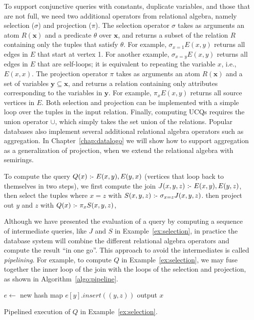 To support conjunctive queries with constants, 
 duplicate variables, and those that are not full,
 we need two additional operators from relational algebra, 
 namely selection ($\sigma$) and projection ($\pi$).
The selection operator $\sigma$ takes as arguments an atom $R({\bm x})$
 and a predicate $\theta$ over ${\bm x}$,
 and returns a subset of the relation $R$ containing only the tuples that satisfy $\theta$.
For example, $\sigma_{x = 1}E(x, y)$ returns all edges in $E$ that start at vertex 1.
For another example, $\sigma_{x = y}E(x, y)$ returns all edges in $E$ that are self-loops;
 it is equivalent to repeating the variable $x$, i.e., $E(x, x)$.
The projection operator $\pi$ takes as arguments an atom $R({\bm x})$
 and a set of variables ${\bm y} \subseteq {\bm x}$,
 and returns a relation containing only attributes corresponding 
 to the variables in ${\bm y}$.
For example, $\pi_{x}E(x, y)$ returns all source vertices in $E$.
Both selection and projection can be implemented with a simple loop over the tuples in the input relation.
Finally, computing UCQs requires the union operator $\cup$,
 which simply takes the set union of the relations.
Popular databases also implement several additional relational algebra operators 
 such as aggregation.
In Chapter~\ref{chap:datalogo} we will show how to support aggregation
 as a generalization of projection, 
 when we extend the relational algebra with semirings.

\begin{ex}
\label{ex:selection}
To compute the query $Q(x) \text{ :- } E(x, y), E(y, x)$ 
 (vertices that loop back to themselves in two steps),
 we first compute the join $J(x, y, z) \text{ :- } E(x, y), E(y, z)$, 
 then select the tuples where $x = z$ with $S(x, y, z) \text{ :- } \sigma_{x=z} J(x, y, z)$.
 then project out $y$ and $z$ with $Q(x) \text{ :- } \pi_{x} S(x, y, z)$,
\end{ex}
 
Although we have presented the evaluation of a query 
 by computing a sequence of intermediate queries, 
 like $J$ and $S$ in Example~\ref{ex:selection},
 in practice the database system will combine
 the different relational algebra operators 
 and compute the result ``in one go''.
This approach to avoid the intermediates 
 is called {\em pipelining}.
For example, to compute $Q$ in Example~\ref{ex:selection},
 we may fuse together the inner loop of the join
 with the loops of the selection and projection, 
 as shown in Algorithm~\ref{algo:pipeline}.

\begin{algorithm}
$e \gets $ new hash map \;
{
    $e[y].insert((y, z))$\;
}
{
    {
        {
            output $x$\;
        }
    }
}
\caption{Pipelined execution of $Q$ in Example~\ref{ex:selection}.}
\label{algo:pipeline} 
\end{algorithm}

